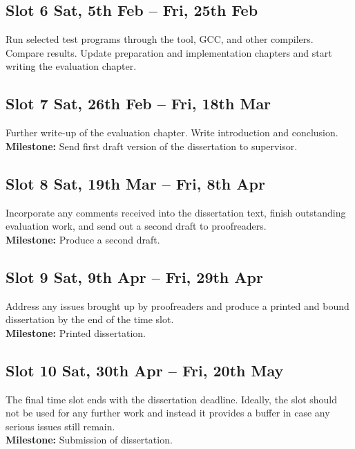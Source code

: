 \documentclass[12pt,a4paper,titlepage]{article}
\begin{document}
\subsection*{Slot 6 \hfill {\small Sat, 5th Feb -- Fri, 25th Feb}}
Run selected test programs through the tool, GCC, and other compilers. Compare results. Update preparation and implementation chapters and start writing the evaluation chapter.

\subsection*{Slot 7 \hfill {\small Sat, 26th Feb -- Fri, 18th Mar}}
Further write-up of the evaluation chapter. Write introduction and conclusion.
\\
{\bfseries Milestone:} Send first draft version of the dissertation to supervisor.

\subsection*{Slot 8 \hfill {\small Sat, 19th Mar -- Fri, 8th Apr}}
Incorporate any comments received into the dissertation text, finish outstanding evaluation work, and send out a second draft to proofreaders.
\\
{\bfseries Milestone:} Produce a second draft.

\subsection*{Slot 9 \hfill {\small Sat, 9th Apr -- Fri, 29th Apr}}
Address any issues brought up by proofreaders and produce a printed and bound dissertation by the end of the time slot.
\\
{\bfseries Milestone:} Printed dissertation.

\subsection*{Slot 10 \hfill {\small Sat, 30th Apr -- Fri, 20th May}}
The final time slot ends with the dissertation deadline. Ideally, the slot should not be used for any further work and instead it provides a buffer in case any serious issues still remain.
\\
{\bfseries Milestone:} Submission of dissertation.

{}

\end{document}
